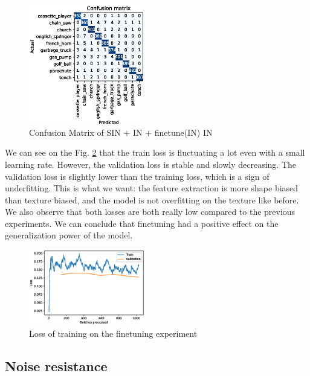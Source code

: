 \documentclass{article}
\begin{document}
\begin{figure}[h!]
  \includegraphics[width = 0.45\textwidth]{imgs/sinin/finetune/fine_tune_confusion_matrix_0.974.eps}
  \caption{Confusion Matrix of SIN + IN + finetune(IN) \texorpdfstring{\textrightarrow} .IN}
  \label{cm_sinin-in-finetune}
\end{figure}



We can see on the Fig. \ref{loss_finetune} that the train loss is fluctuating a lot even with a small
learning rate. However, the validation loss is stable and slowly decreasing.
The validation loss is slightly lower than the training loss, which is a sign of underfitting. This is what we want:
the feature extraction is more shape biased than texture biased, and the model is not overfitting on the texture like
before.
We also observe that both losses are both really low compared to the previous experiments. 
We can conclude that finetuning had a positive effect on the generalization power of the model.

\begin{figure}[h!]
  \includegraphics[width = 0.45\textwidth]{imgs/sinin/finetune/loss.eps}
  \caption{Loss of training on the finetuning experiment}
  \label{loss_finetune}
\end{figure}

\subsection{Noise resistance}
\end{document}
